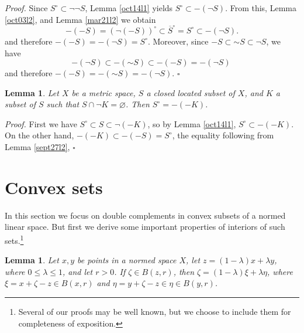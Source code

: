 \documentclass[11pt]{article}%
\newtheorem{lemma}[theorem]{Lemma}
\newenvironment{proof}[1][Proof]{\noindent\textit{#1.} }{}
\begin{document}
\begin{proof}
Since $S^{\circ}\subset\lnot\lnot S$, Lemma \ref{oct14l1} yields $S^{\circ
}\subset-(\lnot S)$. From this, Lemma \ref{oct03l2}, and Lemma \ref{mar21l2}
we obtain%
\[
-(-S)=\left(  \lnot(-S)\right)  ^{\circ}\subset\overline{S}^{\circ}=S^{\circ
}\subset-(\lnot S)\text{.}%
\]
and therefore $-(-S)=-(\lnot S)=S^{\circ}$. Moreover, since $-S\subset%
\mathord{\sim}%
S\subset\lnot S$, we have%
\[
-\left(  \lnot S\right)  \subset-(%
\mathord{\sim}%
S)\subset-\left(  -S\right)  =-(\lnot S)\
\]
and therefore $-(-S)=-(%
\mathord{\sim}%
S)=-(\lnot S)$.%
\hfill
$\square$
\end{proof}

\begin{lemma}
\label{oct15l1}Let $X$ be a metric space, $S$ a closed located subset of $X$,
and $K$ a subset of $S$ such that $S\cap\lnot K=\varnothing$. Then $S^{\circ
}=-(-K)$.
\end{lemma}

\begin{proof}
First we have $S^{\circ}\subset S\subset\lnot(-K)$, so by Lemma \ref{oct14l1},
$S^{\circ}\subset-(-K)$. On the other hand, $-(-K)\subset-(-S)=S^{\circ}$, the
equality following from Lemma \ref{sept27l2},
\hfill
$\square$
\end{proof}

\section{Convex sets}

In this section we focus on double complements in convex subsets of a normed
linear space. But first we derive some important properties of interiors of
such sets.\footnote{%
\normalfont\sf
Several of our proofs may be well known, but we choose to include them for
completeness of exposition.}

\begin{lemma}
\label{oct03l1}Let $x,y$ be points in a normed space $X$, let $z=\left(
1-\lambda\right)  x+\lambda y$, where $0\leq\lambda\leq1$, and let $r>0$. If
$\zeta\in B(z,r)$, then $\zeta=(1-\lambda)\xi+\lambda\eta$, where $\xi
=x+\zeta-z\in B(x,r)$ and $\eta=y+\zeta-z\in\eta\in B(y,r)$.
\end{lemma}
\end{document}
